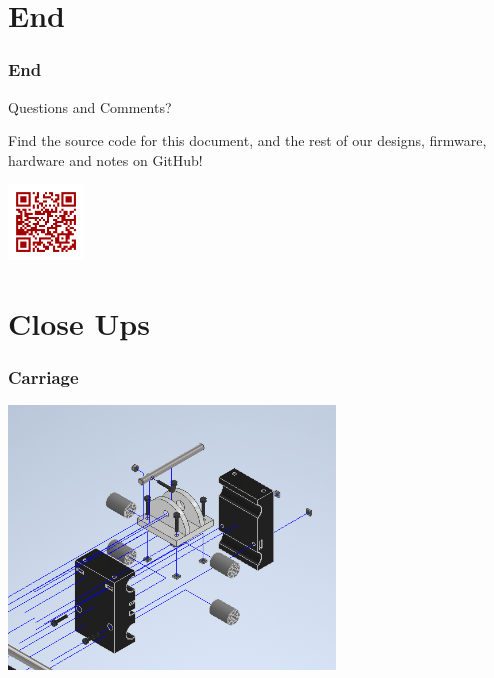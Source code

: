 \documentclass[aspectratio=169]{beamer}
\begin{document}
\section{End}
\begin{frame}
    \frametitle{End}

    \begin{block}{}
        \begin{center}
            \Huge Questions and Comments?
        \end{center}
    \end{block}

    \begin{center}
        Find the source code for this document, and the rest of our designs, firmware, hardware
        and notes on GitHub!

        \includegraphics[height=2cm]{github_qr}
    \end{center}

\end{frame}

\section{Close Ups}
\begin{frame}
    \frametitle{Carriage}

    \includegraphics[height=7cm]{closeup1}
\end{frame}
\end{document}
